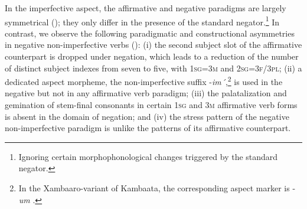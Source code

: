 \documentclass[output=paper,colorlinks,citecolor=brown,draftmode
]{langscibook}
\begin{document}
In the imperfective aspect, the affirmative and negative paradigms are largely symmetrical (); they only differ in the presence of the standard negator.\footnote{Ignoring certain morphophonological changes triggered by the standard negator.} In contrast, we observe the following paradigmatic and constructional asymmetries in negative non-imperfective verbs  (): (i) the second subject slot of the affirmative counterpart is dropped under negation, which leads to a reduction of the number of distinct subject indexes from seven to five, with \textsc{1sg=3m} and \textsc{2sg=3f/3pl}; (ii) a dedicated aspect morpheme, the non-imperfective suffix \mbox{-\textit{im´}},\footnote{In the Xambaaro-variant of Kambaata, the corresponding aspect marker is -\textit{um} \citep[101]{KorhonenEtAl1986}.}  is used in the negative but not in any affirmative verb paradigm; (iii) the palatalization and gemination of stem-final consonants in certain \textsc{1sg} and \textsc{3m} affirmative verb forms is absent in the domain of negation; and (iv) the stress pattern of the negative non-imperfective paradigm is unlike the patterns of its affirmative counterpart.
\end{document}
